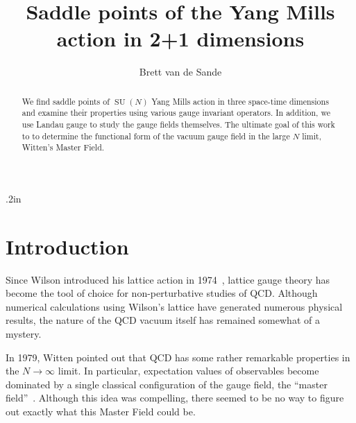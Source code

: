 \documentclass[preprint,aps,prd]{revtex4-2}
\DeclareMathOperator{\SU}{SU}
\begin{document}
\title{Saddle points of the Yang Mills action in 2+1 dimensions}


\author{Brett van de Sande}
\noaffiliation

\begin{abstract}
  We find saddle points of $\SU(N)$ Yang Mills action in three
  space-time dimensions and examine their properties using
  various gauge invariant operators.  In addition, we use Landau
  gauge to study the gauge fields themselves.  The ultimate goal of this work
  to to determine the functional form of the vacuum gauge field in
  the large $N$ limit, Witten's Master Field.
\end{abstract}

\maketitle

\baselineskip .2in

\section{Introduction}
\label{intro}

Since Wilson introduced his lattice action in 1974~\cite{wilson_confinement_1974},
lattice gauge theory has become the tool of choice for
non-perturbative studies of QCD.  Although numerical
calculations using Wilson's lattice have generated numerous
physical results, the nature of the QCD vacuum itself
has remained somewhat of a mystery.


In 1979, Witten pointed out that QCD has some rather remarkable
properties in the $N \to \infty$ limit.  In particular,
expectation values of observables become dominated by a single
classical configuration of the gauge field, the
``master field''~\cite{witten_1/n_1980}.
Although this idea was compelling, there seemed to be no
way to figure out exactly what this Master Field could be.
\end{document}
